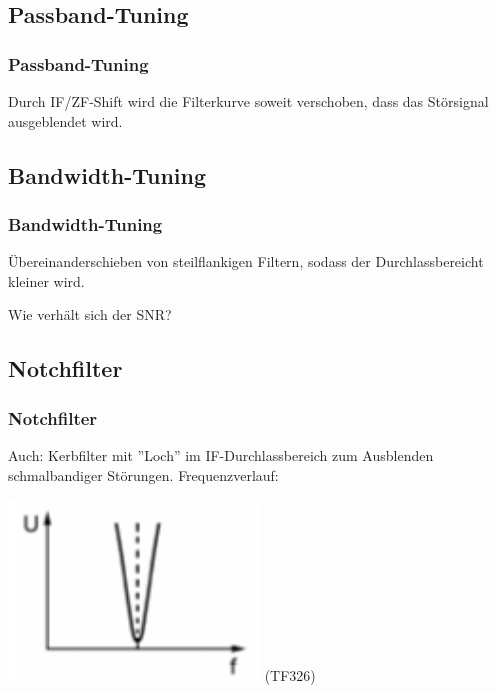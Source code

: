 \subsection{Passband-Tuning}

\begin{frame}
    \frametitle{Passband-Tuning}

    Durch IF/ZF-Shift wird die Filterkurve soweit verschoben, dass das
    Störsignal ausgeblendet wird.


\end{frame}

\subsection{Bandwidth-Tuning}

\begin{frame}
    \frametitle{Bandwidth-Tuning}

    Übereinanderschieben von steilflankigen Filtern, sodass der
    Durchlassbereicht kleiner wird.

    
    \bigskip

    Wie verhält sich der SNR?

\end{frame}

\subsection{Notchfilter}

\begin{frame}
    \frametitle{Notchfilter}

    Auch: Kerbfilter mit ''Loch'' im IF-Durchlassbereich zum Ausblenden
    schmalbandiger Störungen. Frequenzverlauf:

    \begin{center}
    \includegraphics[width=0.5\textwidth]{a18/TF326A.png}
        \tiny (TF326)
    \end{center}

\end{frame}

